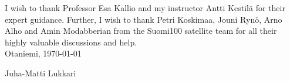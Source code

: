 \documentclass[english,12pt,a4paper,pdftex,elec,utf8]{aaltothesis}
\begin{document}
I wish to thank Professor Esa Kallio
and my instructor Antti Kestilä for their 
expert guidance. Further, I wish to thank Petri Koskimaa, Jouni Rynö, Arno Alho and Amin Modabberian from the Suomi100 satellite team for all their highly valuable discussions and help.\\

\vspace{5cm}
Otaniemi, \today

\vspace{5mm}
{\hfill Juha-Matti Lukkari \hspace{1cm}}

\newpage


\thesistableofcontents






\end{document}
